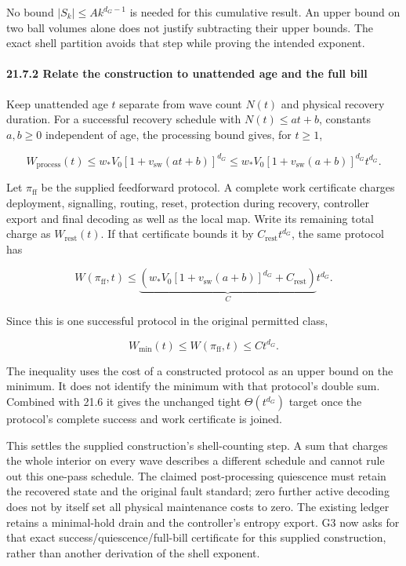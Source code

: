 \documentclass[
]{article}
\begin{document}
No bound \(|S_k|\le A k^{d_G-1}\) is needed for this cumulative result.
An upper bound on two ball volumes alone does not justify subtracting
their upper bounds. The exact shell partition avoids that step while
proving the intended exponent.

\paragraph{21.7.2 Relate the construction to unattended age and the full
bill}\label{relate-the-construction-to-unattended-age-and-the-full-bill}

Keep unattended age \(t\) separate from wave count \(N(t)\) and physical
recovery duration. For a successful recovery schedule with
\(N(t)\le at+b\), constants \(a,b\ge0\) independent of age, the
processing bound gives, for \(t\ge1\),

\[
W_{\mathrm{process}}(t)
\le w_*V_0[1+v_{\mathrm{sw}}(at+b)]^{d_G}
\le w_*V_0[1+v_{\mathrm{sw}}(a+b)]^{d_G}t^{d_G}.
\]

Let \(\pi_{\mathrm{ff}}\) be the supplied feedforward protocol. A
complete work certificate charges deployment, signalling, routing,
reset, protection during recovery, controller export and final decoding
as well as the local map. Write its remaining total charge as
\(W_{\mathrm{rest}}(t)\). If that certificate bounds it by
\(C_{\mathrm{rest}}t^{d_G}\), the same protocol has

\[
W(\pi_{\mathrm{ff}},t)\le
\underbrace{\left(w_*V_0[1+v_{\mathrm{sw}}(a+b)]^{d_G}
+C_{\mathrm{rest}}\right)}_{C}
t^{d_G}.
\]

Since this is one successful protocol in the original permitted class,

\[
\boxed{W_{\min}(t)\le W(\pi_{\mathrm{ff}},t)\le Ct^{d_G}}.
\]

The inequality uses the cost of a constructed protocol as an upper bound
on the minimum. It does not identify the minimum with that protocol's
double sum. Combined with 21.6 it gives the unchanged tight
\(\Theta(t^{d_G})\) target once the protocol's complete success and work
certificate is joined.

This settles the supplied construction's shell-counting step. A sum that
charges the whole interior on every wave describes a different schedule
and cannot rule out this one-pass schedule. The claimed post-processing
quiescence must retain the recovered state and the original fault
standard; zero further active decoding does not by itself set all
physical maintenance costs to zero. The existing ledger retains a
minimal-hold drain and the controller's entropy export. G3 now asks for
that exact
s\allowbreak{}u\allowbreak{}c\allowbreak{}c\allowbreak{}e\allowbreak{}s\allowbreak{}s\allowbreak{}/\allowbreak{}q\allowbreak{}u\allowbreak{}i\allowbreak{}e\allowbreak{}s\allowbreak{}c\allowbreak{}e\allowbreak{}n\allowbreak{}c\allowbreak{}e\allowbreak{}/\allowbreak{}f\allowbreak{}u\allowbreak{}l\allowbreak{}l\allowbreak{}-\allowbreak{}b\allowbreak{}i\allowbreak{}l\allowbreak{}l
certificate for this supplied construction, rather than another
derivation of the shell exponent.
\end{document}
